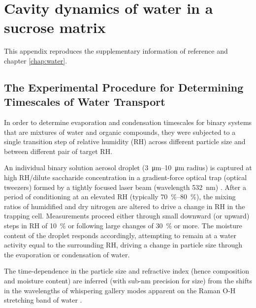 %
%

\chapter{Cavity dynamics of water in a sucrose matrix}\label{app:wat}
This appendix reproduces the supplementary information of reference \cite{songTransientCavityDynamics2020a} and chapter \ref{chap:water}. 

\section{The Experimental Procedure for Determining Timescales of Water Transport}

In order to determine evaporation and condensation timescales for binary systems that are mixtures of water and organic compounds, they were subjected to a single transition step of relative humidity (RH) across different particle size and between different pair of target RH. 

An individual binary solution aerosol droplet (\SIrange[range-phrase=--]{3}{10}{\micro\meter} radius) is captured at high RH/dilute saccharide concentration in a gradient-force optical trap (optical tweezers) formed by a tightly focused laser beam (wavelength \SI{532}{\nano\meter}) \cite{powerProbingMicrorheologicalProperties2014, Song2016a}. After a period of conditioning at an elevated RH (typically \SIrange[range-phrase=--]{70}{80}{\percent}), the mixing ratios of humidified and dry nitrogen are altered to drive a change in RH in the trapping cell. Measurements proceed either through small downward (or upward) steps in RH of \SI{10}{\percent} or following large changes of \SI{30}{\percent} or more. The moisture content of the droplet responds accordingly, attempting to remain at a water activity equal to the surrounding RH, driving a change in particle size through the evaporation or condensation of water. 

The time-dependence in the particle size and refractive index (hence composition and moisture content) are inferred (with sub-\si{\nano\meter} precision for size) from the shifts in the wavelengths of whispering gallery modes apparent on the Raman O-H stretching band of water \cite{prestonAccurateEfficientDetermination2013,reidSpectroscopicStudiesSize2007,reidLaserProbingSingleaerosol2006}.

